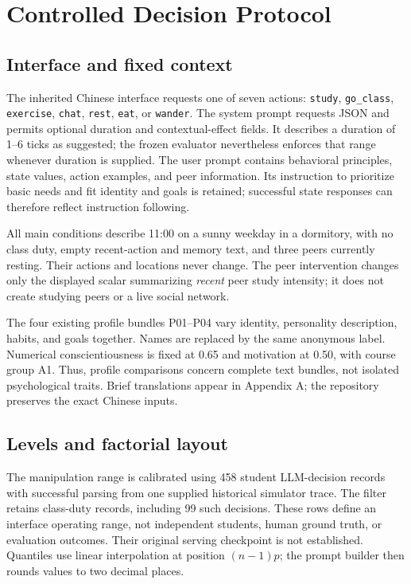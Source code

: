\documentclass[conference]{IEEEtran}
\newcommand{\code}[1]{\texttt{#1}}
\begin{document}
\section{Controlled Decision Protocol}
\subsection{Interface and fixed context}
The inherited Chinese interface requests one of seven actions: \code{study}, \code{go\_class}, \code{exercise}, \code{chat}, \code{rest}, \code{eat}, or \code{wander}. The system prompt requests JSON and permits optional duration and contextual-effect fields. It describes a duration of 1--6 ticks as suggested; the frozen evaluator nevertheless enforces that range whenever duration is supplied. The user prompt contains behavioral principles, state values, action examples, and peer information. Its instruction to prioritize basic needs and fit identity and goals is retained; successful state responses can therefore reflect instruction following.

All main conditions describe 11:00 on a sunny weekday in a dormitory, with no class duty, empty recent-action and memory text, and three peers currently resting. Their actions and locations never change. The peer intervention changes only the displayed scalar summarizing \emph{recent} peer study intensity; it does not create studying peers or a live social network.

The four existing profile bundles P01--P04 vary identity, personality description, habits, and goals together. Names are replaced by the same anonymous label. Numerical conscientiousness is fixed at 0.65 and motivation at 0.50, with course group A1. Thus, profile comparisons concern complete text bundles, not isolated psychological traits. Brief translations appear in Appendix A; the repository preserves the exact Chinese inputs.

\subsection{Levels and factorial layout}
The manipulation range is calibrated using 458 student LLM-decision records with successful parsing from one supplied historical simulator trace. The filter retains class-duty records, including 99 such decisions. These rows define an interface operating range, not independent students, human ground truth, or evaluation outcomes. Their original serving checkpoint is not established. Quantiles use linear interpolation at position $(n-1)p$; the prompt builder then rounds values to two decimal places.
\end{document}
